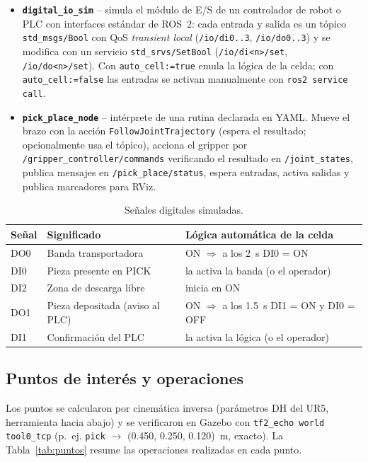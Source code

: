 \documentclass[11pt,letterpaper]{article}
\begin{document}
\begin{itemize}[leftmargin=*]
  \item \textbf{\texttt{digital\_io\_sim}} -- simula el módulo de E/S de un controlador de robot o PLC con interfaces estándar de ROS~2: cada entrada y salida es un tópico \texttt{std\_msgs/Bool} con QoS \emph{transient local} (\texttt{/io/di0..3}, \texttt{/io/do0..3}) y se modifica con un servicio \texttt{std\_srvs/SetBool} (\texttt{/io/di<n>/set}, \texttt{/io/do<n>/set}). Con \texttt{auto\_cell:=true} emula la lógica de la celda; con \texttt{auto\_cell:=false} las entradas se activan manualmente con \texttt{ros2 service call}.
  \item \textbf{\texttt{pick\_place\_node}} -- intérprete de una rutina declarada en YAML. Mueve el brazo con la acción \texttt{FollowJointTrajectory} (espera el resultado; opcionalmente usa el tópico), acciona el gripper por \texttt{/gripper\_controller/commands} verificando el resultado en \texttt{/joint\_states}, publica mensajes en \texttt{/pick\_place/status}, espera entradas, activa salidas y publica marcadores para RViz.
\end{itemize}

\begin{table}[H]
\centering
\caption{Señales digitales simuladas.}
\label{tab:io}
\begin{tabularx}{\linewidth}{@{}l l X@{}}
\toprule
Señal & Significado & Lógica automática de la celda \\
\midrule
DO0 & Banda transportadora & ON $\Rightarrow$ a los 2~s DI0 = ON \\
DI0 & Pieza presente en PICK & la activa la banda (o el operador) \\
DI2 & Zona de descarga libre & inicia en ON \\
DO1 & Pieza depositada (aviso al PLC) & ON $\Rightarrow$ a los 1.5~s DI1 = ON y DI0 = OFF \\
DI1 & Confirmación del PLC & la activa la lógica (o el operador) \\
\bottomrule
\end{tabularx}
\end{table}

\subsection{Puntos de interés y operaciones}
Los puntos se calcularon por cinemática inversa (parámetros DH del UR5, herramienta hacia abajo) y se verificaron en Gazebo con \texttt{tf2\_echo world tool0\_tcp} (p.~ej. \texttt{pick} $\rightarrow$ (0.450, 0.250, 0.120)~m, exacto). La Tabla~\ref{tab:puntos} resume las operaciones realizadas en cada punto.
\end{document}

